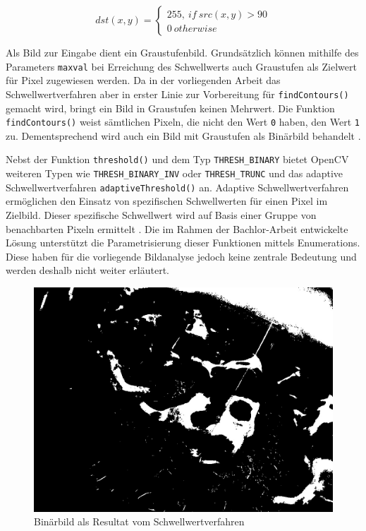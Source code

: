 \begin{equation}\label{Schwellwertanalyse}
dst(x,y) =\begin{cases}
255,\: if \: src(x,y) > 90\\
0\: otherwise
\end{cases}
\end{equation}

Als Bild zur Eingabe dient ein Graustufenbild. Grundsätzlich können mithilfe des Parameters \texttt{maxval} bei Erreichung des Schwellwerts auch Graustufen als Zielwert für Pixel zugewiesen werden. Da in der vorliegenden Arbeit das Schwellwertverfahren aber in erster Linie zur Vorbereitung für \texttt{findContours()} gemacht wird, bringt ein Bild in Graustufen keinen Mehrwert. Die Funktion \texttt{findContours()} weist sämtlichen Pixeln, die nicht den Wert \texttt{0} haben, den Wert \texttt{1} zu. Dementsprechend wird auch ein Bild mit Graustufen als Binärbild behandelt \cite[S. 366]{FernandezVillan2019}. 



Nebst der Funktion \texttt{threshold()} und dem Typ \texttt{THRESH_BINARY} bietet OpenCV weiteren Typen wie \texttt{THRESH_BINARY_INV} oder \texttt{THRESH_TRUNC} und das adaptive Schwellwertverfahren \texttt{adaptiveThreshold()} an. Adaptive Schwellwertverfahren ermöglichen den Einsatz von spezifischen Schwellwerten für einen Pixel im Zielbild. Dieser spezifische Schwellwert wird auf Basis einer Gruppe von benachbarten Pixeln  ermittelt \cite[S.342 f]{FernandezVillan2019}. Die im Rahmen der Bachlor-Arbeit entwickelte Lösung unterstützt die Parametrisierung dieser Funktionen mittels Enumerations. Diese haben für die vorliegende Bildanalyse jedoch keine zentrale Bedeutung und werden deshalb nicht weiter erläutert.

\begin{figure}[H]
	\center
	\includegraphics[scale=0.43]{Grafiken/entwicklung/8thresholdedMask.jpg}
	\caption{Binärbild als Resultat vom Schwellwertverfahren} 
		\label{fig: Binärbild als Resultat vom Schwellwertverfahren}
\end{figure}
		

